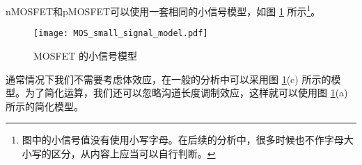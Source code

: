 nMOSFET和pMOSFET可以使用一套相同的小信号模型，如图 \ref{fig:mosfet-small-signal-model} 所示\footnote{图中的小信号值没有使用小写字母。在后续的分析中，很多时候也不作字母大小写的区分，从内容上应当可以自行判断。}。
\begin{figure}[!htb]
    \centering
    \texttt{[image: MOS\_small\_signal\_model.pdf]}
    \caption{MOSFET 的小信号模型\cite{Analog-CMOS}}
    \label{fig:mosfet-small-signal-model}
\end{figure}
通常情况下我们不需要考虑体效应，在一般的分析中可以采用图 \ref{fig:mosfet-small-signal-model}(c) 所示的模型。为了简化运算，我们还可以忽略沟道长度调制效应，这样就可以使用图 \ref{fig:mosfet-small-signal-model}(a) 所示的简化模型。
